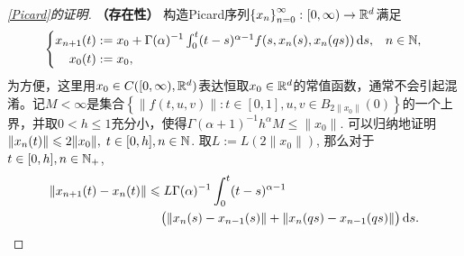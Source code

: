 \begin{proof}[\cref{Picard}的证明]
    \textbf{（存在性）} 构造Picard序列$\left\{x_n\right\}_{n=0}^\infty\colon [0,\infty)\to \mathbb{R}^d$满足
    \begin{equation}\label{PicardSequence}
        \left\{\begin{aligned}
            x_{n+1}(t)&:=x_0 + \Gamma(\alpha)^{-1} \textstyle\int_0^t (t-s)^{\alpha-1} f(s,x_n(s),x_n(qs))\mathop{}\!\mathrm{d} s, & n\in \mathbb{N},\\
            x_0(t)&:=x_0, & {}
        \end{aligned}\right.
    \end{equation}
    为方便，这里用$x_0\in C([0,\infty),\mathbb{R}^d)$表达恒取$x_0\in\mathbb{R}^d$的常值函数，通常不会引起混淆。记$M<\infty$是集合$\left\{\left\|f(t,u,v)\right\|\colon t\in [0,1], u,v\in B_{2\|x_0\|}(0)\right\}$的一个上界，并取$0<h\leqslant 1$充分小，使得$\Gamma(\alpha + 1)^{-1} h^\alpha M \leqslant \|x_0\|$. 可以归纳地证明$\left\|x_{n}(t)\right\|\leqslant 2\|x_0\|,\;t\in [0,h],n\in \mathbb{N}$. 取$L:=L(2\|x_0\|)$, 那么对于$t\in [0,h],n\in \mathbb{N_+}$,
    \begin{equation}\label{Picard估计递归}
        \begin{aligned}
            \left\| x_{n+1}(t)-x_n(t) \right\|&\leqslant L\Gamma(\alpha)^{-1}\int_0^t (t-s)^{\alpha-1} \\ &\relphantom{\leqslant}\bigl(\left\|x_n(s)-x_{n-1}(s)\right\| + \left\|x_n(qs)-x_{n-1}(qs)\right\|\bigr) \differential s.
        \end{aligned}
    \end{equation}


\end{proof}
